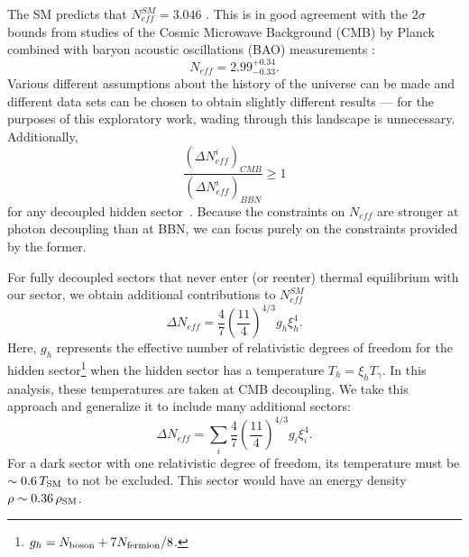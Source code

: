 \documentclass[nofootinbib,twocolumn,preprintnumbers]{revtex4-1}
\begin{document}
The SM predicts that $N^{SM}_{eff} = 3.046$ \cite{Mangano:2005cc}. This is in good agreement with the $2\sigma$ bounds from studies of the Cosmic Microwave Background (CMB) by Planck combined with baryon acoustic oscillations (BAO) measurements \cite{Aghanim:2018eyx}:
\begin{equation}\label{eqn:NeffBounds}
N_{eff} = 2.99^{+0.34}_{-0.33}.
\end{equation}
Various different assumptions about the history of the universe can be made and different data sets can be chosen to obtain slightly different results \cite{Breitbach:2018ddu} --- for the purposes of this exploratory work, wading through this landscape is unnecessary. Additionally, 
\begin{equation}
\frac{(\Delta N^i_{eff})_{CMB}}{(\Delta N^i_{eff})_{BBN}} \geq 1
\end{equation}
for any  decoupled hidden sector~\cite{Arkani-Hamed:2016rle}. Because the constraints on $N_{eff}$ are stronger at photon decoupling than at BBN, we can focus purely on the constraints provided by the former.

For fully decoupled sectors that never enter (or reenter) thermal equilibrium with our sector, we obtain additional contributions to $N^{SM}_{eff}$ \cite{Breitbach:2018ddu}
\begin{equation}\label{eqn:DeltaNeff1hs}
\Delta N_{eff} = \frac{4}{7}\left(\frac{11}{4}\right)^{4/3}g_h \xi_h^4.
\end{equation} 
Here, $g_h$ represents the effective number of relativistic degrees of freedom for the hidden sector\footnote{$g_h = N_{\rm boson} + 7 N_{\rm fermion}/8$.} when the hidden sector has a temperature $T_h = \xi_h T_\gamma$. In this analysis, these temperatures are taken at CMB decoupling. 
We take this approach and generalize it to include many additional sectors:
\begin{equation}\label{eqn:DeltaNeff}
\Delta N_{eff} = \sum_i \frac{4}{7}\left(\frac{11}{4}\right)^{4/3}g_{i} \xi^4_{i}.
\end{equation} 
For a dark sector with one relativistic degree of freedom, its temperature must be $\sim 0.6\, T_{\rm SM}$ to not be excluded. This sector would have an energy density $\rho \sim 0.36\, \rho_{\rm SM}$. 


\end{document}
